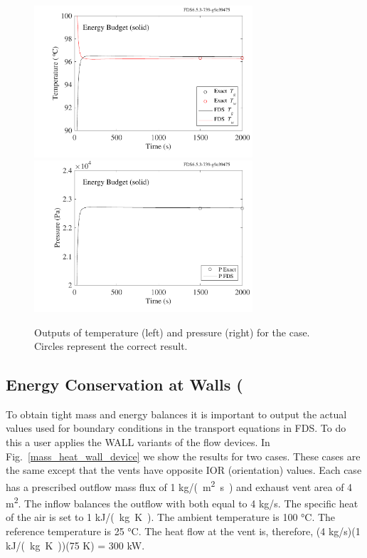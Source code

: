 \documentclass[11pt]{book}
\begin{document}
\begin{figure}[ht]
\includegraphics[width=3.2in]{SCRIPT_FIGURES/energy_budget_solid_T}
\includegraphics[width=3.2in]{SCRIPT_FIGURES/energy_budget_solid_P}
\caption[The  test case]{\label{fig_solid_energy} Outputs of temperature (left) and pressure (right) for the  case.  Circles represent the correct result.}
\end{figure}


\subsection{Energy Conservation at Walls (\texorpdfstring{})}
\label{mass_heat_wall_device_test}
\label{mass_heat_wall_device_test_2}

To obtain tight mass and energy balances it is important to output the actual values used for boundary conditions in the transport equations in FDS.  To do this a user applies the WALL variants of the flow devices.  In Fig.~\ref{mass_heat_wall_device} we show the results for two cases.  These cases are the same except that the vents have opposite {\ct IOR} (orientation) values.  Each case has a prescribed outflow mass flux of 1 \si{kg/(m^2.s)} and exhaust vent area of 4 \si{m^2}.  The inflow balances the outflow with both equal to 4 \si{kg/s}.  The specific heat of the air is set to 1 \si{kJ/(kg.K)}.  The ambient temperature is 100 \si{\degreeCelsius}.  The reference temperature is 25 \si{\degreeCelsius}.  The heat flow at the vent is, therefore, (4 \si{kg/s})(1 \si{kJ/(kg.K)})(75 K) = 300 kW.
\end{document}
